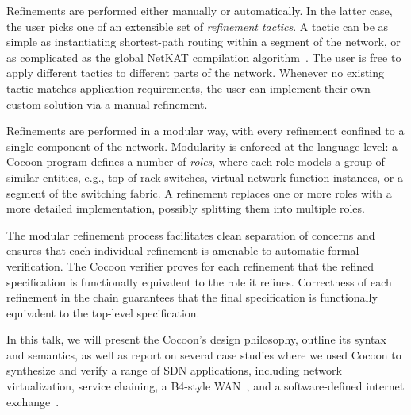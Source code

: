 \documentclass[letterpaper,10pt,twocolumn]{article}
\begin{document}
Refinements are performed either manually or automatically.  In 
the latter case, the user picks one of an extensible set of 
\emph{refinement tactics}.  A tactic can be as simple as 
instantiating shortest-path routing within a segment of the 
network, or as complicated as the global NetKAT compilation 
algorithm~\cite{Smolka_EFG_15}.  The user is free to apply 
different tactics to different parts of the network.  Whenever no 
existing tactic matches application requirements, the user can 
implement their own custom solution via a manual refinement.

Refinements are performed in a modular way, with every refinement 
confined to a single component of the network.  Modularity is 
enforced at the language level: a Cocoon program defines a number 
of \emph{roles}, where each role models a group of similar 
entities, e.g., top-of-rack switches, virtual network function 
instances, or a segment of the switching fabric.  A refinement 
replaces one or more roles with a more detailed implementation, 
possibly splitting them into multiple roles.  

The modular refinement process facilitates clean separation of 
concerns and ensures that each individual refinement is amenable 
to automatic formal verification.  The Cocoon verifier proves for 
each refinement that the refined specification is functionally 
equivalent to the role it refines.  Correctness of each refinement 
in the chain guarantees that the final specification is 
functionally equivalent to the top-level specification.  


In this talk, we will present the Cocoon's design philosophy, 
outline its syntax and semantics, as well as report on several 
case studies where we used Cocoon to synthesize and verify a range 
of SDN applications, including network virtualization, service 
chaining, a B4-style WAN~\cite{Jain_KMOPSVWZZZHSV_13}, and a 
software-defined internet exchange~\cite{Gupta_MBCFRV_16}. 



\setlength{\bibsep}{1pt}
%


\end{document}
